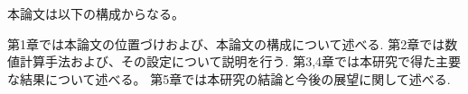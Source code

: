 \documentclass[/Users/ikedahajime/GitHub/reserch/master_report/thesis]{subfiles}
\begin{document}



本論文は以下の構成からなる。

第1章では本論文の位置づけおよび、本論文の構成について述べる.
第2章では数値計算手法および、その設定について説明を行う.
第3,4章では本研究で得た主要な結果について述べる。
第5章では本研究の結論と今後の展望に関して述べる.
\end{document}
